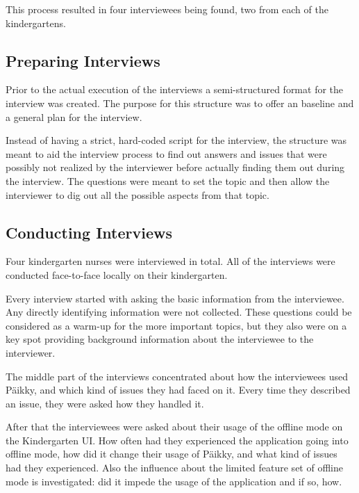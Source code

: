 This process resulted in four interviewees being found, two from each of the kindergartens. 




\subsection{Preparing Interviews}
Prior to the actual execution of the interviews a semi-structured format for the interview was created. The purpose for this structure was to offer an baseline and a general plan for the interview. 

Instead of having a strict, hard-coded script for the interview, the structure was meant to aid the interview process to find out answers and issues that were possibly not realized by the interviewer before actually finding them out during the interview. The questions were meant to set the topic and then allow the interviewer to dig out all the possible aspects from that topic.







\subsection{Conducting Interviews}

Four kindergarten nurses were interviewed in total. All of the interviews were conducted face-to-face locally on their kindergarten. 

Every interview started with asking the basic information from the interviewee. Any directly identifying information were not collected. These questions could be considered as a warm-up for the more important topics, but they also were on a key spot providing background information about the interviewee to the interviewer. 

The middle part of the interviews concentrated about how the interviewees used Päikky, and which kind of issues they had faced on it. Every time they described an issue, they were asked how they handled it.

After that the interviewees were asked about their usage of the offline mode on the Kindergarten UI. How often had they experienced the application going into offline mode, how did it change their usage of Päikky, and what kind of issues had they experienced. Also the influence about the limited feature set of offline mode is investigated: did it impede the usage of the application and if so, how.


